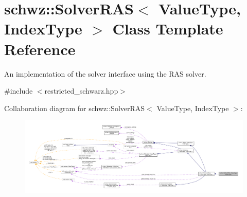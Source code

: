 \hypertarget{classschwz_1_1SolverRAS}{}\section{schwz\+:\+:Solver\+R\+AS$<$ Value\+Type, Index\+Type $>$ Class Template Reference}
\label{classschwz_1_1SolverRAS}


An implementation of the solver interface using the R\+AS solver.  




{\ttfamily \#include $<$restricted\+\_\+schwarz.\+hpp$>$}



Collaboration diagram for schwz\+:\+:Solver\+R\+AS$<$ Value\+Type, Index\+Type $>$\+:
\nopagebreak
\begin{figure}[H]
\begin{center}
\leavevmode
\includegraphics[width=350pt]{classschwz_1_1SolverRAS__coll__graph}
\end{center}
\end{figure}
